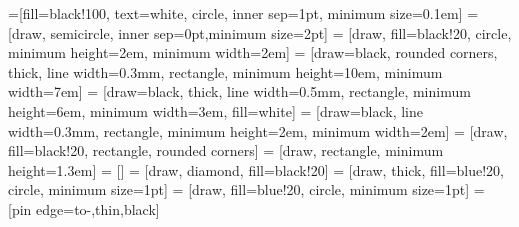 \usetikzlibrary{shapes,arrows}
\usetikzlibrary{backgrounds}
\usetikzlibrary{matrix, positioning, fit}
\usetikzlibrary{patterns}

 =[fill=black!100, text=white, circle, inner sep=1pt, minimum size=0.1em]
 = [draw, semicircle, inner sep=0pt,minimum size=2pt]
 = [draw, fill=black!20, circle, minimum height=2em, minimum width=2em]
 = [draw=black, rounded corners, thick, line width=0.3mm, rectangle, minimum height=10em, minimum width=7em]
 = [draw=black, thick, line width=0.5mm, rectangle, minimum height=6em, minimum width=3em, fill=white]
 = [draw=black, line width=0.3mm, rectangle, minimum height=2em, minimum width=2em]
 = [draw, fill=black!20, rectangle, rounded corners]
 = [draw, rectangle, minimum height=1.3em]
 = []
 = [draw, diamond, fill=black!20]
 = [draw, thick, fill=blue!20, circle, minimum size=1pt]
 = [draw, fill=blue!20, circle, minimum size=1pt]
 = [pin edge={to-,thin,black}]

